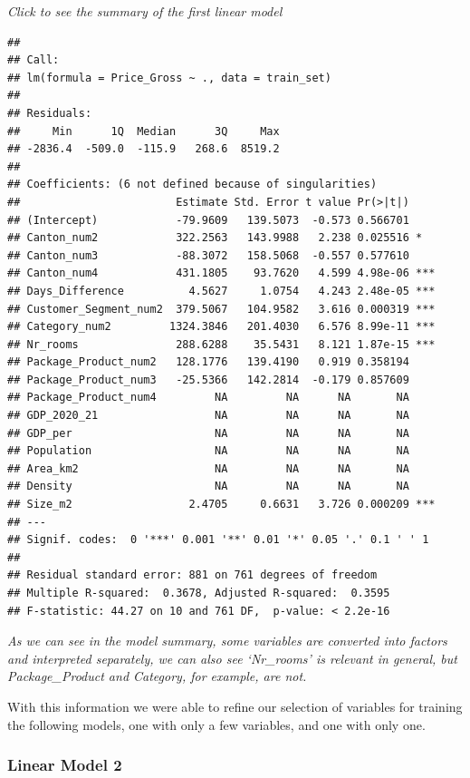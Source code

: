 \documentclass[
]{article}
\begin{document}
\emph{Click to see the summary of the first linear model}

\begin{verbatim}
## 
## Call:
## lm(formula = Price_Gross ~ ., data = train_set)
## 
## Residuals:
##     Min      1Q  Median      3Q     Max 
## -2836.4  -509.0  -115.9   268.6  8519.2 
## 
## Coefficients: (6 not defined because of singularities)
##                        Estimate Std. Error t value Pr(>|t|)    
## (Intercept)            -79.9609   139.5073  -0.573 0.566701    
## Canton_num2            322.2563   143.9988   2.238 0.025516 *  
## Canton_num3            -88.3072   158.5068  -0.557 0.577610    
## Canton_num4            431.1805    93.7620   4.599 4.98e-06 ***
## Days_Difference          4.5627     1.0754   4.243 2.48e-05 ***
## Customer_Segment_num2  379.5067   104.9582   3.616 0.000319 ***
## Category_num2         1324.3846   201.4030   6.576 8.99e-11 ***
## Nr_rooms               288.6288    35.5431   8.121 1.87e-15 ***
## Package_Product_num2   128.1776   139.4190   0.919 0.358194    
## Package_Product_num3   -25.5366   142.2814  -0.179 0.857609    
## Package_Product_num4         NA         NA      NA       NA    
## GDP_2020_21                  NA         NA      NA       NA    
## GDP_per                      NA         NA      NA       NA    
## Population                   NA         NA      NA       NA    
## Area_km2                     NA         NA      NA       NA    
## Density                      NA         NA      NA       NA    
## Size_m2                  2.4705     0.6631   3.726 0.000209 ***
## ---
## Signif. codes:  0 '***' 0.001 '**' 0.01 '*' 0.05 '.' 0.1 ' ' 1
## 
## Residual standard error: 881 on 761 degrees of freedom
## Multiple R-squared:  0.3678, Adjusted R-squared:  0.3595 
## F-statistic: 44.27 on 10 and 761 DF,  p-value: < 2.2e-16
\end{verbatim}

\emph{As we can see in the model summary, some variables are converted
into factors and interpreted separately, we can also see `Nr\_rooms' is
relevant in general, but Package\_Product and Category, for example, are
not.}

With this information we were able to refine our selection of variables
for training the following models, one with only a few variables, and
one with only one.

\subsubsection{Linear Model 2}\label{linear-model-2}
\end{document}
